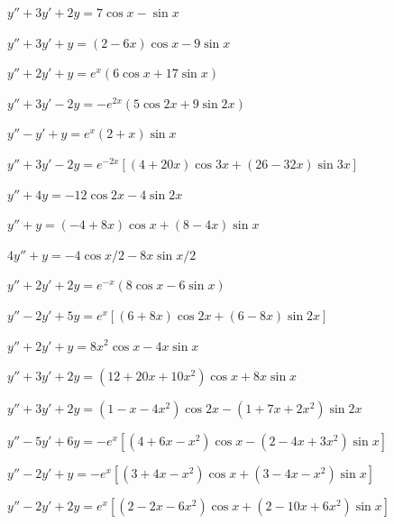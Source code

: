 \begin{exerciselist}
  \item\label{exer:5.5.1} $y''+3y'+2y=7\cos x-\sin x$

  \item\label{exer:5.5.2} $y''+3y'+y=(2-6x)\cos x-9\sin x$

  \item\label{exer:5.5.3} $y''+2y'+y=e^{x}(6\cos x+17\sin x)$

  \item\label{exer:5.5.4} $y''+3y'-2y=-e^{2x}(5\cos2x+9\sin2x)$

  \item\label{exer:5.5.5} $y''-y'+y=e^{x}(2+x)\sin x$

  \item\label{exer:5.5.6} $y''+3y'-2y=e^{-2x}\left[(4+20x)\cos3x+(26-32x)\sin 3x\right]$

  \item\label{exer:5.5.7} $y''+4y=-12\cos2x-4\sin2x$

  \item\label{exer:5.5.8} $y''+y=(-4+8x)\cos x+(8-4x)\sin x$

  \item\label{exer:5.5.9} $4y''+y=-4\cos x/2-8x\sin x/2$

  \item\label{exer:5.5.10} $y''+2y'+2y=e^{-x}(8\cos x-6\sin x)$

  \item\label{exer:5.5.11} $y''-2y'+5y=e^{x}\left[(6+8x)\cos 2x+(6-8x)\sin2x\right]$

  \item\label{exer:5.5.12} $y''+2y'+y=8x^{2}\cos x-4x\sin x$

  \item\label{exer:5.5.13} $y''+3y'+2y=(12+20x+10x^{2})\cos x+8x\sin x$

  \item\label{exer:5.5.14} $y''+3y'+2y=(1-x-4x^{2})\cos2x-(1+7x+2x^{2})\sin2x$

  \item\label{exer:5.5.15} $y''-5y'+6y=-e^{x}\left[(4+6x-x^{2})\cos x-(2-4x+3x^{2})\sin x\right]$

  \item\label{exer:5.5.16} $y''-2y'+y=-e^{x}\left[(3+4x-x^{2})\cos x+(3-4x-x^{2})\sin x\right]$

  \item\label{exer:5.5.17} $y''-2y'+2y=e^{x}\left[(2-2x-6x^{2})\cos x+(2-10x+6x^{2})\sin x\right]$


\end{exerciselist}
